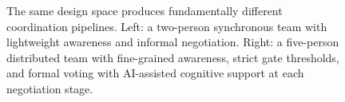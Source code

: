\begin{figure}[t]
\centering
{}
\caption{The same design space produces fundamentally different coordination pipelines. Left: a two-person synchronous team with lightweight awareness and informal negotiation. Right: a five-person distributed team with fine-grained awareness, strict gate thresholds, and formal voting with AI-assisted cognitive support at each negotiation stage.}
\label{fig:pipeline-comparison}
\end{figure}

